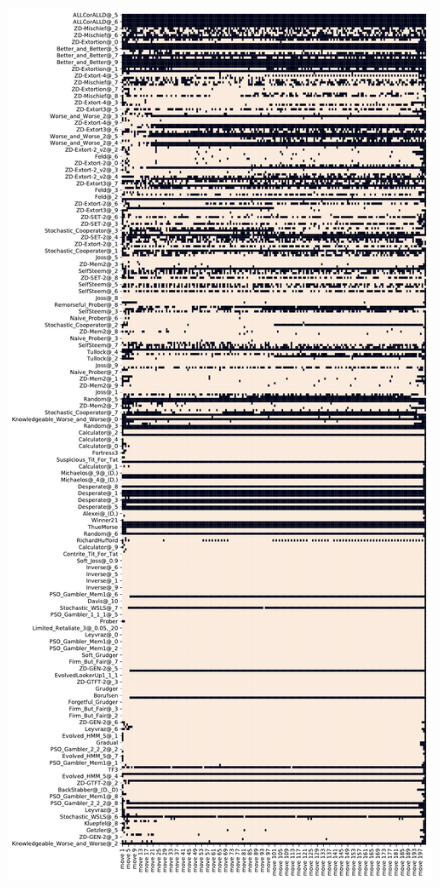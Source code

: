 \begin{figure}[ht]
    \centering
    \begin{minipage}{0.48\textwidth}
        \centering
        \includegraphics[width=1.0\textwidth, center]{./img/descriptive/sequence_plot_score_pt1.pdf}

\end{minipage}
\end{figure}
